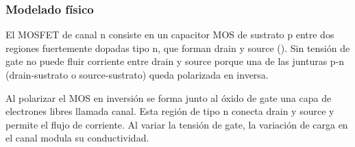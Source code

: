 \subsubsection{Modelado físico}
El MOSFET de canal n consiste en un capacitor MOS de sustrato p entre dos regiones fuertemente dopadas 
tipo n, 
que forman drain y source ().
Sin tensión de gate no puede fluir corriente entre drain y source porque una de las
junturas p-n (drain-sustrato o source-sustrato) queda polarizada en inversa.

Al polarizar el MOS en inversión se forma junto al óxido de gate 
una capa de electrones libres llamada canal.
Esta región de tipo n conecta drain y source y permite el flujo de corriente.
Al variar la tensión de gate, la variación de carga en el canal modula su
conductividad.
